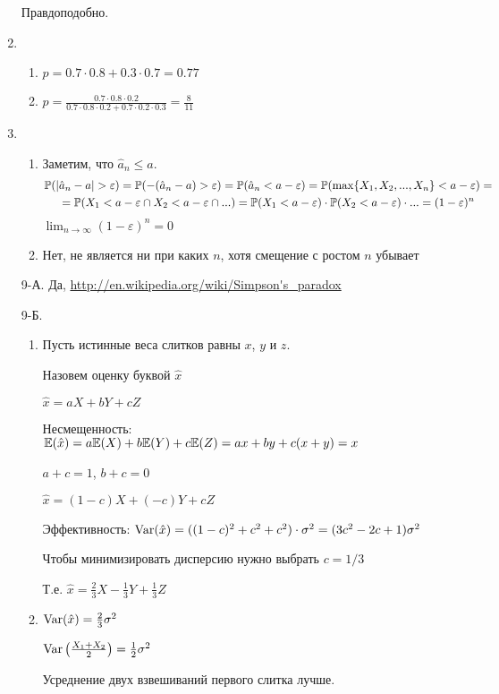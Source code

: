 \begin{enumerate}
Правдоподобно.
\item
\begin{enumerate}
\item $p=0.7\cdot 0.8+ 0.3\cdot 0.7=0.77$
\item $p=\frac{0.7\cdot0.8\cdot0.2}{0.7\cdot 0.8\cdot 0.2 + 0.7\cdot 0.2 \cdot 0.3}=\frac{8}{11}$
\end{enumerate}
\item
\begin{enumerate}
\item Заметим, что $\hat{a}_{n}\leq a$.
\begin{multline*}
\P(|\hat{a}_{n}-a|>\varepsilon)=\P(-(\hat{a}_{n}-a)>\varepsilon)=\P(\hat{a}_{n}<a-\varepsilon)=\P(\max\{X_{1},X_{2},...,X_{n}\}<a-\varepsilon)= \\
=\P(X_{1}<a-\varepsilon \cap X_{2}< a-\varepsilon\cap ...)=\P(X_{1}<a-\varepsilon)\cdot \P(X_{2}<a-\varepsilon)\cdot ...=(1-\varepsilon)^{n}
\end{multline*}
$\lim_{n\to\infty} (1-\varepsilon)^{n} =0$
\item Нет, не является ни при каких $n$, хотя смещение с ростом $n$ убывает
\end{enumerate}
\item[9-А.] Да, \url{http://en.wikipedia.org/wiki/Simpson's_paradox}
\item[9-Б.]
\begin{enumerate}
\item Пусть истинные веса слитков равны $x$, $y$ и $z$.

Назовем оценку буквой $\hat{x}$

$\hat{x}=aX+bY+cZ$

Несмещенность: $\mathbb{E}(\hat{x})=a\mathbb{E}(X)+b\mathbb{E}(Y)+c\mathbb{E}(Z)=ax+by+c(x+y)=x$

$a+c=1$, $b+c=0$

$\hat{x}=(1-c)X+(-c)Y+cZ$

Эффективность: $\operatorname{Var}(\hat{x})=((1-c)^{2}+c^{2}+c^{2})\cdot \sigma^{2}=(3c^{2}-2c+1)\sigma^{2}$

Чтобы минимизировать дисперсию нужно выбрать $c=1/3$

Т.е. $\hat{x}=\frac{2}{3}X-\frac{1}{3}Y+\frac{1}{3}Z$
\item $\operatorname{Var}(\hat{x})=\frac{2}{3}\sigma^{2}$

$\operatorname{Var}\left(\frac{X_{1}+X_{2}}{2}\right)=\frac{1}{2}\sigma^{2}$

Усреднение двух взвешиваний первого слитка лучше.
\end{enumerate}
\end{enumerate}

